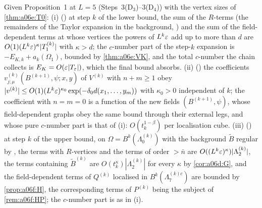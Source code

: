 \begin{proposition}\label{prop:a06e:B12}
Given Proposition~1 at $L=5$ (Steps~3(D$_3$)--3(D$_4$)) with the vertex sizes of \cref{thm:a06e:T0}: \textup{(i)} (\cite[Prop.~3.1]{Ba1}) at step $k$ of the lower bound, the sum of the $R$-terms (the remainders of the Taylor expansion in the background, \cite[(1.9), (1.11), (1.15)]{Ba3}) and the sum of the field-dependent terms at whose vertices the powers of $L^k\varepsilon$ add up to more than $d$ are $O(1)(L^k\varepsilon)^\kappa|T^{(k)}_1|$ with $\kappa>d$; the $c$-number part of the step-$k$ expansion is $-E_{K,k}+a_k(\Omega_1)$, bounded by \cref{thm:a06e:VK}, and the total $c$-number the chain collects is $E_K=O(\varepsilon|T_{\varepsilon}|)$, which the final bound absorbs. \textup{(ii)} (\cite[Prop.~3.2, (3.57)--(3.58)]{Ba1}) the coefficients $v^{(k)}_{j;\mu}(B^{(k+1)},\psi;x,y)$ of $V^{(k)}$ with $n+m\ge1$ obey $|v^{(k)}|\le O(1)(L^k\varepsilon)^{\kappa_0}\exp(-\delta_0d(x_1,\dots,y_m))$ with $\kappa_0>0$ independent of $k$; the coefficient with $n=m=0$ is a function of the new fields $(B^{(k+1)},\psi)$, whose field-dependent graphs obey the same bound through their external legs, and whose pure $c$-number part is that of \textup{(i)}: $O(t_k^{1-\beta})$ per localisation cube. \textup{(iii)} (\cite[p.~579]{Ba2}) at step $k$ of the upper bound, on $\Omega=B^k(\Lambda^{(k)}_0)$ with the background $\tilde B$ regular by \cite[(2.98)]{Ba2}, the terms with $R$-vertices and the terms of order $>\bar n$ are $O((L^k\varepsilon)^\kappa)|\Lambda^{(k)}_2|$, the terms containing $\tilde B^{(k)}$ are $O(t_k^\kappa)|\Lambda^{(k)}_2|$ for every $\kappa$ by \cref{cor:a06d:G}, and the field-dependent terms of $Q^{(k)}$ localised in $B^k(\Lambda^{(k)c}_7)$ are bounded by \cref{prop:a06f:H}, the corresponding terms of $P^{(k)}$ being the subject of \cref{rem:a06f:HP}; the $c$-number part is as in \textup{(i)}.
\end{proposition}

